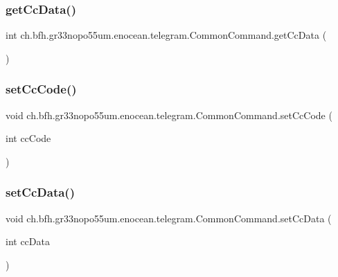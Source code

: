 \subsubsection{\texorpdfstring{get\+Cc\+Data()}{getCcData()}}
{\footnotesize\ttfamily int ch.\+bfh.\+gr33nopo55um.\+enocean.\+telegram.\+Common\+Command.\+get\+Cc\+Data (\begin{DoxyParamCaption}{ }\end{DoxyParamCaption})}

\hypertarget{classch_1_1bfh_1_1gr33nopo55um_1_1enocean_1_1telegram_1_1_common_command_aa7d557542800c865665fa823b14d0de3}{}\label{classch_1_1bfh_1_1gr33nopo55um_1_1enocean_1_1telegram_1_1_common_command_aa7d557542800c865665fa823b14d0de3} 
\subsubsection{\texorpdfstring{set\+Cc\+Code()}{setCcCode()}}
{\footnotesize\ttfamily void ch.\+bfh.\+gr33nopo55um.\+enocean.\+telegram.\+Common\+Command.\+set\+Cc\+Code (\begin{DoxyParamCaption}\item[{int}]{cc\+Code }\end{DoxyParamCaption})}

\hypertarget{classch_1_1bfh_1_1gr33nopo55um_1_1enocean_1_1telegram_1_1_common_command_ae14e058541169d29e06d1898b5095351}{}\label{classch_1_1bfh_1_1gr33nopo55um_1_1enocean_1_1telegram_1_1_common_command_ae14e058541169d29e06d1898b5095351} 
\subsubsection{\texorpdfstring{set\+Cc\+Data()}{setCcData()}}
{\footnotesize\ttfamily void ch.\+bfh.\+gr33nopo55um.\+enocean.\+telegram.\+Common\+Command.\+set\+Cc\+Data (\begin{DoxyParamCaption}\item[{int}]{cc\+Data }\end{DoxyParamCaption})}

